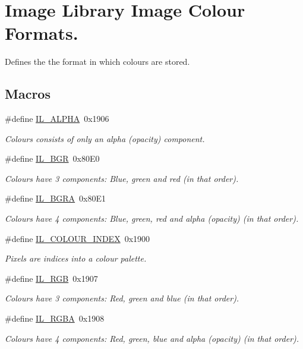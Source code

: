 \hypertarget{group__il__data__formats}{\section{Image Library Image Colour Formats.}
\label{group__il__data__formats}
}


Defines the the format in which colours are stored.  


\subsection*{Macros}
\begin{DoxyCompactItemize}
\item 
\#define \hyperlink{group__il__data__formats_ga8e13d65936f37fd5aa4a162b378992e5}{I\+L\+\_\+\+A\+L\+P\+H\+A}~0x1906
\begin{DoxyCompactList}\small\item\em Colours consists of only an alpha (opacity) component. \end{DoxyCompactList}\item 
\#define \hyperlink{group__il__data__formats_gac1f7a347ffb9fb71744e9309acaa9f01}{I\+L\+\_\+\+B\+G\+R}~0x80\+E0
\begin{DoxyCompactList}\small\item\em Colours have 3 components\+: Blue, green and red (in that order). \end{DoxyCompactList}\item 
\#define \hyperlink{group__il__data__formats_gad01e1a54be1855fb19b68e5bd258b976}{I\+L\+\_\+\+B\+G\+R\+A}~0x80\+E1
\begin{DoxyCompactList}\small\item\em Colours have 4 components\+: Blue, green, red and alpha (opacity) (in that order). \end{DoxyCompactList}\item 
\#define \hyperlink{group__il__data__formats_ga2d5d7096248447f2ee131af82814392a}{I\+L\+\_\+\+C\+O\+L\+O\+U\+R\+\_\+\+I\+N\+D\+E\+X}~0x1900
\begin{DoxyCompactList}\small\item\em Pixels are indices into a colour palette. \end{DoxyCompactList}\item 
\#define \hyperlink{group__il__data__formats_ga7887e132189ba7764bf37f3e08bb27ae}{I\+L\+\_\+\+R\+G\+B}~0x1907
\begin{DoxyCompactList}\small\item\em Colours have 3 components\+: Red, green and blue (in that order). \end{DoxyCompactList}\item 
\#define \hyperlink{group__il__data__formats_ga79b9ca197717185124861531cd40ea36}{I\+L\+\_\+\+R\+G\+B\+A}~0x1908
\begin{DoxyCompactList}\small\item\em Colours have 4 components\+: Red, green, blue and alpha (opacity) (in that order). \end{DoxyCompactList}\end{DoxyCompactItemize}


